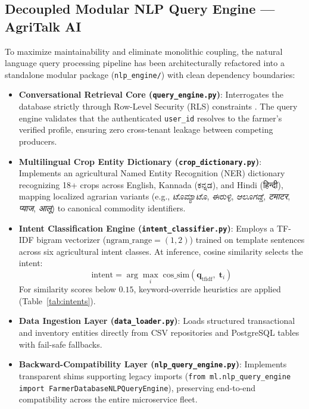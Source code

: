 \subsection{Decoupled Modular NLP Query Engine --- AgriTalk AI}
\label{subsec:nlp_engine}
To maximize maintainability and eliminate monolithic coupling, the natural language query processing pipeline has been architecturally refactored into a standalone modular package (\texttt{nlp\_engine/}) with clean dependency boundaries:
\begin{itemize}
    \item \textbf{Conversational Retrieval Core (\texttt{query\_engine.py})}: Interrogates the database strictly through Row-Level Security (RLS) constraints \cite{Manning2008, Salton1983}. The query engine validates that the authenticated \texttt{user\_id} resolves to the farmer's verified profile, ensuring zero cross-tenant leakage between competing producers.
    \item \textbf{Multilingual Crop Entity Dictionary (\texttt{crop\_dictionary.py})}: Implements an agricultural Named Entity Recognition (NER) dictionary recognizing 18+ crops across English, Kannada (ಕನ್ನಡ), and Hindi (हिन्दी), mapping localized agrarian variants (e.g., \textit{ಟೊಮ್ಯಾಟೊ}, \textit{ಈರುಳ್ಳಿ}, \textit{ಆಲೂಗಡ್ಡೆ}, \textit{टमाटर}, \textit{प्याज}, \textit{आलू}) to canonical commodity identifiers.
    \item \textbf{Intent Classification Engine (\texttt{intent\_classifier.py})}: Employs a TF-IDF bigram vectorizer ($\text{ngram\_range} = (1,2)$) \cite{Pedregosa2011} trained on template sentences across six agricultural intent classes. At inference, cosine similarity selects the intent:
    \begin{equation}
    \text{intent} = \arg\max_i \; \text{cos\_sim}\!\left(\mathbf{q}_{\text{tfidf}},\; \mathbf{t}_i\right)
    \label{eqn:intent_cls}
    \end{equation}
    For similarity scores below $0.15$, keyword-override heuristics are applied (Table~\ref{tab:intents}).
    \item \textbf{Data Ingestion Layer (\texttt{data\_loader.py})}: Loads structured transactional and inventory entities directly from CSV repositories and PostgreSQL tables with fail-safe fallbacks.
    \item \textbf{Backward-Compatibility Layer (\texttt{nlp\_query\_engine.py})}: Implements transparent shims supporting legacy imports (\texttt{from ml.nlp\_query\_engine import FarmerDatabaseNLPQueryEngine}), preserving end-to-end compatibility across the entire microservice fleet.
\end{itemize}

